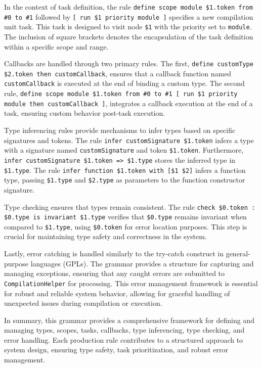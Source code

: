 In the context of task definition, the rule \texttt{define scope module \$1.token from \#0 to \#1} followed by \texttt{[ run \$1 priority module ]} specifies a new compilation unit task. This task is designed to visit node \texttt{\$1} with the priority set to \texttt{module}. The inclusion of square brackets denotes the encapsulation of the task definition within a specific scope and range.

Callbacks are handled through two primary rules. The first, \texttt{define customType \$2.token then customCallback}, ensures that a callback function named \texttt{customCallback} is executed at the end of binding a custom type. The second rule, \texttt{define scope module \$1.token from \#0 to \#1 [ run \$1 priority module then customCallback ]}, integrates a callback execution at the end of a task, ensuring custom behavior post-task execution.

Type inferencing rules provide mechanisms to infer types based on specific signatures and tokens. The rule \texttt{infer customSignature \$1.token} infers a type with a signature named \texttt{customSignature} and token \texttt{\$1.token}. Furthermore, \texttt{infer customSignature \$1.token => \$1.type} stores the inferred type in \texttt{\$1.type}. The rule \texttt{infer function \$1.token with [\$1 \$2]} infers a function type, passing \texttt{\$1.type} and \texttt{\$2.type} as parameters to the function constructor signature.

Type checking ensures that types remain consistent. The rule \texttt{check \$0.token : \$0.type is invariant \$1.type} verifies that \texttt{\$0.type} remains invariant when compared to \texttt{\$1.type}, using \texttt{\$0.token} for error location purposes. This step is crucial for maintaining type safety and correctness in the system.

Lastly, error catching is handled similarly to the try-catch construct in general-purpose languages (GPLs). The grammar provides a structure for capturing and managing exceptions, ensuring that any caught errors are submitted to \texttt{CompilationHelper} for processing. This error management framework is essential for robust and reliable system behavior, allowing for graceful handling of unexpected issues during compilation or execution.

In summary, this grammar provides a comprehensive framework for defining and managing types, scopes, tasks, callbacks, type inferencing, type checking, and error handling. Each production rule contributes to a structured approach to system design, ensuring type safety, task prioritization, and robust error management.

